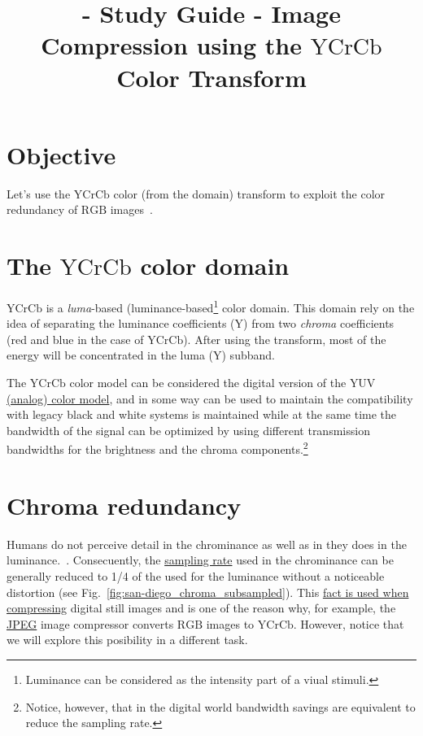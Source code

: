 
 \title{\SM{} - Study Guide - Image
  Compression using the $\text{YCrCb}$ Color Transform}

\maketitle
\tableofcontents

\section{Objective}
Let's use the
\href{https://en.wikipedia.org/wiki/YCbCr}{$\text{YCrCb}$} color (from
the  domain) transform to exploit the color redundancy of
$\text{RGB}$ images~\cite{vruiz__visual_redundancy}. 

\section{The $\text{YCrCb}$ color domain}
$\text{YCrCb}$ is a \emph{luma}-based
(luminance-based\footnote{Luminance can be considered as the intensity
part of a viual stimuli.} color domain. This domain rely on the idea
of separating the luminance coefficients (Y) from two \emph{chroma}
coefficients (red and blue in the case of $\text{YCrCb}$). After using
the transform, most of the energy will be concentrated in the luma
($\text{Y}$) subband.

The $\text{YCrCb}$ color model can be considered the digital version
of the \href{https://en.wikipedia.org/wiki/YUV}{$\text{YUV}$ (analog)
  color model}, and in some way can be used to maintain the
compatibility with legacy black and white systems is maintained while
at the same time the bandwidth of the signal can be optimized by using
diﬀerent transmission bandwidths for the brightness and the chroma
components.\footnote{Notice, however, that in the digital world
bandwidth savings are equivalent to reduce the sampling
rate.}~\cite{burger2016digital}

\section{Chroma redundancy}

Humans do not perceive detail in the chrominance as well as in they
does in the
luminance.~\cite{vruiz__visual_redundancy,burger2016digital}. Consecuently,
the
\href{https://en.wikipedia.org/wiki/Sampling_(signal_processing)}{sampling
  rate} used in the chrominance can be generally reduced to 1/4 of the
used for the luminance without a noticeable distortion (see
Fig.~\ref{fig:san-diego_chroma_subsampled}). This
\href{https://en.wikipedia.org/wiki/Bandwidth_(computing)}{fact is
  used when compressing} digital still images and is one of the reason
why, for example, the \href{https://en.wikipedia.org/wiki/JPEG}{JPEG}
image compressor converts $\text{RGB}$ images to
$\text{YCrCb}$. However, notice that we will explore this posibility
in a different task.

